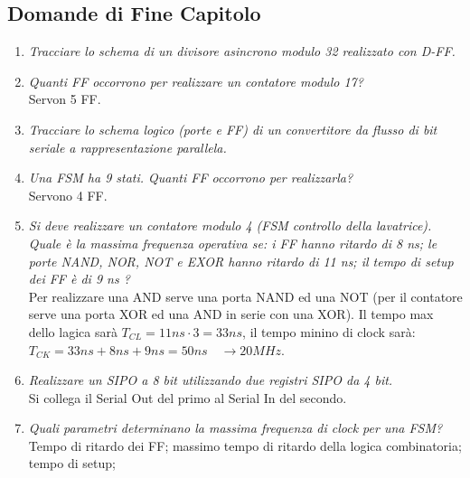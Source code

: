 \documentclass[12pt]{article}
\begin{document}
\subsection{Domande di Fine Capitolo}
\begin{enumerate}
    \item \emph{Tracciare lo schema di un divisore asincrono modulo 32 realizzato con D-FF.}

    \item \emph{Quanti FF occorrono per realizzare un contatore modulo 17?} \\
        Servon 5 FF.

    \item \emph{Tracciare lo schema logico (porte e FF) di un convertitore da flusso di bit seriale a rappresentazione parallela.} 

    \item \emph{Una FSM ha 9 stati. Quanti FF occorrono per realizzarla?} \\
        Servono 4 FF.

    \item \emph{Si deve realizzare un contatore modulo 4 (FSM controllo della lavatrice). Quale è la massima frequenza operativa se: i FF hanno ritardo di 8 ns; le porte NAND, NOR, NOT e EXOR hanno ritardo di 11 ns; il tempo di setup dei FF è di 9 ns ?} \\
        Per realizzare una AND serve una porta NAND ed una NOT (per il contatore serve una porta XOR ed una AND in serie con una XOR). Il tempo max dello lagica sar\`a $T_{CL} = 11ns\cdot 3 = 33ns$, il tempo minino di clock sar\`a: $T_{CK} = 33ns + 8ns +  9ns = 50ns\quad\to 20MHz$.

    \item \emph{Realizzare un SIPO a 8 bit utilizzando due registri SIPO da 4 bit.} \\
        Si collega il Serial Out del primo al Serial In del secondo.

    \item \emph{Quali parametri determinano la massima frequenza di clock per una FSM?}
        Tempo di ritardo dei FF; massimo tempo di ritardo della logica combinatoria; tempo di setup;
\end{enumerate}
\end{document}
